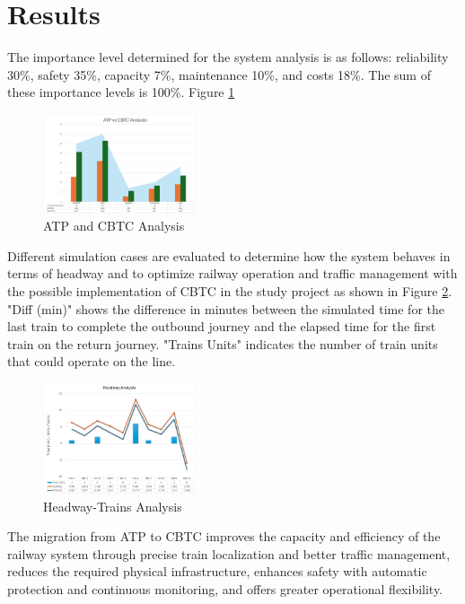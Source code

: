 \documentclass[conference]{IEEEtran}
\begin{document}
\section{Results}
The importance level determined for the system analysis is as follows: reliability 30\%, safety 35\%, capacity 7\%, maintenance 10\%, and costs 18\%. The sum of these importance levels is 100\%. Figure \ref{fig:Analysis}
\begin{figure}[htbp]
    \centering
\includegraphics[width=0.4\textwidth, scale=1]{Imagenes_general/Grahp_general.png}
    \caption{ ATP and CBTC Analysis}
    \label{fig:Analysis}
\end{figure}
Different simulation cases are evaluated to determine how the system behaves in terms of headway and to optimize railway operation and traffic management with the possible implementation of CBTC in the study project as shown in Figure \ref{fig:Headway-Trains Analysis}. "Diff (min)" shows the difference in minutes between the simulated time for the last train to complete the outbound journey and the elapsed time for the first train on the return journey. "Trains Units" indicates the number of train units that could operate on the line. 
\begin{figure}[htbp]
    \centering
\includegraphics[width=0.4\textwidth,scale=1]{Imagenes_general/Analysis_Headway.jpg}
    \caption{Headway-Trains Analysis}
    \label{fig:Headway-Trains Analysis}
\end{figure}
The migration from ATP to CBTC improves the capacity and efficiency of the railway system through precise train localization and better traffic management, reduces the required physical infrastructure, enhances safety with automatic protection and continuous monitoring, and offers greater operational flexibility.\\
\end{document}
